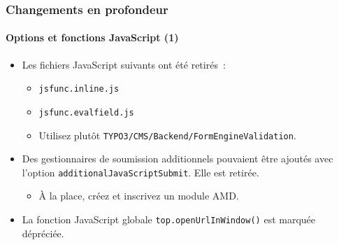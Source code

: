 \begin{frame}[fragile]
	\frametitle{Changements en profondeur}
	\framesubtitle{Options et fonctions JavaScript (1)}

	\begin{itemize}
		\item Les fichiers JavaScript suivants ont été retirés~:

			\begin{itemize}
				\item \texttt{jsfunc.inline.js}
				\item \texttt{jsfunc.evalfield.js}
			\end{itemize}

			\begin{itemize}\smaller
				\item[\ding{228}] Utilisez plutôt \texttt{TYPO3/CMS/Backend/FormEngineValidation}.
			\end{itemize}\normalsize

		\item Des gestionnaires de soumission additionnels pouvaient être ajoutés avec l'option
			\texttt{additionalJavaScriptSubmit}. Elle est retirée.

			\begin{itemize}\smaller
				\item[\ding{228}] À la place, créez et inscrivez un module AMD\@.
			\end{itemize}\normalsize

		\item La fonction JavaScript globale \texttt{top.openUrlInWindow()} est marquée dépréciée.

	\end{itemize}

\end{frame}


